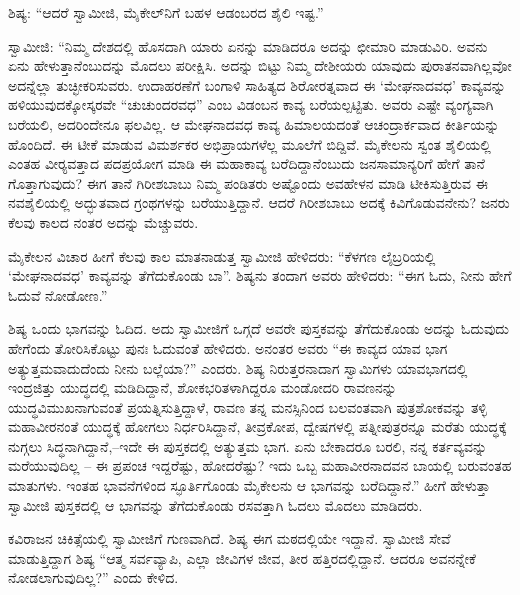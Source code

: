  ಶಿಷ್ಯ: “ಆದರೆ ಸ್ವಾಮೀಜಿ, ಮೈಕೇಲ್‌ನಿಗೆ ಬಹಳ ಆಡಂಬರದ ಶೈಲಿ ಇಷ್ಟ.” 

 ಸ್ವಾಮೀಜಿ: “ನಿಮ್ಮ ದೇಶದಲ್ಲಿ ಹೊಸದಾಗಿ ಯಾರು ಏನನ್ನು ಮಾಡಿದರೂ ಅದನ್ನು ಛೀಮಾರಿ ಮಾಡುವಿರಿ. ಅವನು ಏನು ಹೇಳುತ್ತಾನೆಂಬುದನ್ನು ಮೊದಲು ಪರೀಕ್ಷಿಸಿ. ಅದನ್ನು ಬಿಟ್ಟು ನಿಮ್ಮ ದೇಶೀಯರು ಯಾವುದು ಪುರಾತನವಾಗಿಲ್ಲವೋ ಅದನ್ನೆಲ್ಲಾ ತುಚ್ಛೀಕರಿಸುವರು. ಉದಾಹರಣೆಗೆ ಬಂಗಾಳಿ ಸಾಹಿತ್ಯದ ಶಿರೋರತ್ನವಾದ ಈ ‘ಮೇಘನಾದವಧ’ ಕಾವ್ಯವನ್ನು ಹಳಿಯುವುದಕ್ಕೋಸ್ಕರವೇ “ಚುಚುಂದರವಧ” ಎಂಬ ವಿಡಂಬನ ಕಾವ್ಯ ಬರೆಯಲ್ಪಟ್ಟಿತು. ಅವರು ಎಷ್ಟೇ ವ್ಯಂಗ್ಯವಾಗಿ ಬರೆಯಲಿ, ಅದರಿಂದೇನೂ ಫಲವಿಲ್ಲ. ಆ ಮೇಘನಾದವಧ ಕಾವ್ಯ ಹಿಮಾಲಯದಂತೆ ಆಚಂದ್ರಾರ್ಕವಾದ ಕೀರ್ತಿಯನ್ನು ಹೊಂದಿದೆ. ಈ ಟೀಕೆ ಮಾಡುವ ವಿಮರ್ಶಕರ ಅಭಿಪ್ರಾಯಗಳೆಲ್ಲ ಮೂಲೆಗೆ ಬಿದ್ದಿವೆ. ಮೈಕೇಲನು ಸ್ವಂತ ಶೈಲಿಯಲ್ಲಿ ಎಂತಹ ವೀರ‍್ಯವತ್ತಾದ ಪದಪ್ರಯೋಗ ಮಾಡಿ ಈ ಮಹಾಕಾವ್ಯ ಬರೆದಿದ್ದಾನೆಂಬುದು ಜನಸಾಮಾನ್ಯರಿಗೆ ಹೇಗೆ ತಾನೆ ಗೊತ್ತಾಗುವುದು? ಈಗ ತಾನೆ ಗಿರೀಶಬಾಬು ನಿಮ್ಮ ಪಂಡಿತರು ಅಷ್ಟೊಂದು ಅವಹೇಳನ ಮಾಡಿ ಟೀಕಿಸುತ್ತಿರುವ ಈ ನವಶೈಲಿಯಲ್ಲಿ ಅದ್ಭುತವಾದ ಗ್ರಂಥಗಳನ್ನು ಬರೆಯುತ್ತಿದ್ದಾನೆ. ಆದರೆ ಗಿರೀಶಬಾಬು ಅದಕ್ಕೆ ಕಿವಿಗೊಡುವನೇನು? ಜನರು ಕೆಲವು ಕಾಲದ ನಂತರ ಅದನ್ನು ಮೆಚ್ಚುವರು. 

 ಮೈಕೇಲನ ವಿಚಾರ ಹೀಗೆ ಕೆಲವು ಕಾಲ ಮಾತನಾಡುತ್ತ ಸ್ವಾಮೀಜಿ ಹೇಳಿದರು: “ಕೆಳಗಣ ಲೈಬ್ರರಿಯಲ್ಲಿ ‘ಮೇಘನಾದವಧ’ ಕಾವ್ಯವನ್ನು ತೆಗೆದುಕೊಂಡು ಬಾ”. ಶಿಷ್ಯನು ತಂದಾಗ ಅವರು ಹೇಳಿದರು: “ಈಗ ಓದು, ನೀನು ಹೇಗೆ ಓದುವೆ ನೋಡೋಣ.” 

 ಶಿಷ್ಯ ಒಂದು ಭಾಗವನ್ನು ಓದಿದ. ಅದು ಸ್ವಾಮೀಜಿಗೆ ಒಗ್ಗದೆ ಅವರೇ ಪುಸ್ತಕವನ್ನು ತೆಗೆದುಕೊಂಡು ಅದನ್ನು ಓದುವುದು ಹೇಗೆಂದು ತೋರಿಸಿಕೊಟ್ಟು ಪುನಃ ಓದುವಂತೆ ಹೇಳಿದರು. ಅನಂತರ ಅವರು “ಈ ಕಾವ್ಯದ ಯಾವ ಭಾಗ ಅತ್ಯುತ್ತಮವಾದುದೆಂದು ನೀನು ಬಲ್ಲೆಯಾ?” ಎಂದರು. ಶಿಷ್ಯ ನಿರುತ್ತರನಾದಾಗ ಸ್ವಾಮಿಗಳು ಯಾವಭಾಗದಲ್ಲಿ ಇಂದ್ರಜಿತ್ತು ಯುದ್ಧದಲ್ಲಿ ಮಡಿದಿದ್ದಾನೆ, ಶೋಕಭರಿತಳಾಗಿದ್ದರೂ ಮಂಡೋದರಿ ರಾವಣನನ್ನು ಯುದ್ಧವಿಮುಖನಾಗುವಂತೆ ಪ್ರಯತ್ನಿಸುತ್ತಿದ್ದಾಳೆ, ರಾವಣ ತನ್ನ ಮನಸ್ಸಿನಿಂದ ಬಲವಂತವಾಗಿ ಪುತ್ರಶೋಕವನ್ನು ತಳ್ಳಿ ಮಹಾವೀರನಂತೆ ಯುದ್ಧಕ್ಕೆ ಹೋಗಲು ನಿರ್ಧರಿಸಿದ್ದಾನೆ, ತೀವ್ರಕೋಪ, ದ್ವೇಷಗಳಲ್ಲಿ ಪತ್ನೀಪುತ್ರರನ್ನೂ ಮರೆತು ಯುದ್ಧಕ್ಕೆ ನುಗ್ಗಲು ಸಿದ್ಧನಾಗಿದ್ದಾನೆ,\break –ಇದೇ ಈ ಪುಸ್ತಕದಲ್ಲಿ ಅತ್ಯುತ್ತಮ ಭಾಗ. ಏನು ಬೇಕಾದರೂ ಬರಲಿ, ನನ್ನ ಕರ್ತವ್ಯವನ್ನು ಮರೆಯುವುದಿಲ್ಲ – ಈ ಪ್ರಪಂಚ ಇದ್ದರೆಷ್ಟು, ಹೋದರೆಷ್ಟು? ಇದು ಒಬ್ಬ ಮಹಾವೀರನಾದವನ ಬಾಯಲ್ಲಿ ಬರುವಂತಹ ಮಾತುಗಳು. ಇಂತಹ ಭಾವನೆಗಳಿಂದ ಸ್ಫೂರ್ತಿಗೊಂಡು ಮೈಕೇಲನು ಆ ಭಾಗವನ್ನು ಬರೆದಿದ್ದಾನೆ.” ಹೀಗೆ ಹೇಳುತ್ತಾ ಸ್ವಾಮೀಜಿ ಪುಸ್ತಕದಲ್ಲಿ ಆ ಭಾಗವನ್ನು ತೆಗೆದುಕೊಂಡು ರಸವತ್ತಾಗಿ ಓದಲು ಮೊದಲು ಮಾಡಿದರು. 

\delimiter

 ಕವಿರಾಜನ ಚಿಕಿತ್ಸೆಯಲ್ಲಿ ಸ್ವಾಮೀಜಿಗೆ ಗುಣವಾಗಿದೆ. ಶಿಷ್ಯ ಈಗ ಮಠದಲ್ಲಿಯೇ ಇದ್ದಾನೆ. ಸ್ವಾಮೀಜಿ ಸೇವೆ ಮಾಡುತ್ತಿದ್ದಾಗ ಶಿಷ್ಯ “ಆತ್ಮ ಸರ್ವವ್ಯಾಪಿ, ಎಲ್ಲಾ ಜೀವಿಗಳ ಜೀವ, ತೀರ ಹತ್ತಿರದಲ್ಲಿದ್ದಾನೆ. ಆದರೂ ಅವನನ್ನೇಕೆ ನೋಡಲಾಗುವುದಿಲ್ಲ?” ಎಂದು ಕೇಳಿದ. 

